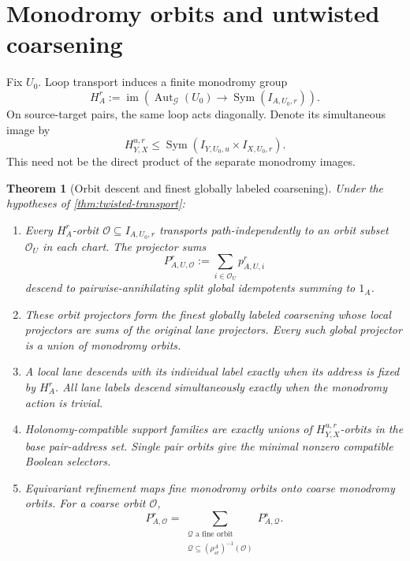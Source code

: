 \documentclass[11pt]{article}
\newtheorem{theorem}{Theorem}[section]
\newcommand{\Aut}{\operatorname{Aut}}
\newcommand{\Sym}{\operatorname{Sym}}
\begin{document}
\section{Monodromy orbits and untwisted coarsening}

Fix \(U_0\).  Loop transport induces a finite monodromy group
\[
 H_A^r:=\operatorname{im}\left(
 \Aut_{\mathscr G}(U_0)\to\Sym(I_{A,U_0,r})
 \right).
\]
On source-target pairs, the same loop acts diagonally.  Denote its simultaneous image by
\[
 H_{Y,X}^{u,r}\leq
 \Sym(I_{Y,U_0,u}\times I_{X,U_0,r}).
\]
This need not be the direct product of the separate monodromy images.

\begin{theorem}[Orbit descent and finest globally labeled coarsening]
\label{thm:orbit-descent}
Under the hypotheses of \cref{thm:twisted-transport}:
\begin{enumerate}[label=\textup{(O\arabic*)},leftmargin=3.4em]
\item Every \(H_A^r\)-orbit \(\mathcal O\subseteq I_{A,U_0,r}\) transports path-independently to an orbit subset \(\mathcal O_U\) in each chart.  The projector sums
\[
 P^r_{A,U,\mathcal O}:=\sum_{i\in\mathcal O_U}p^r_{A,U,i}
\]
descend to pairwise-annihilating split global idempotents summing to \(1_A\).

\item These orbit projectors form the finest globally labeled coarsening whose local projectors are sums of the original lane projectors.  Every such global projector is a union of monodromy orbits.

\item A local lane descends with its individual label exactly when its address is fixed by \(H_A^r\).  All lane labels descend simultaneously exactly when the monodromy action is trivial.

\item Holonomy-compatible support families are exactly unions of
\(H_{Y,X}^{u,r}\)-orbits in the base pair-address set.  Single pair orbits give the minimal nonzero compatible Boolean selectors.

\item Equivariant refinement maps fine monodromy orbits onto coarse monodromy orbits.  For a coarse orbit \(\mathcal O\),
\[
 P^r_{A,\mathcal O}
 =
 \sum_{\substack{\mathcal Q\text{ a fine orbit}\\
 \mathcal Q\subseteq(\rho^A_{sr})^{-1}(\mathcal O)}}
 P^s_{A,\mathcal Q}.
\]
\end{enumerate}
\end{theorem}
\end{document}
